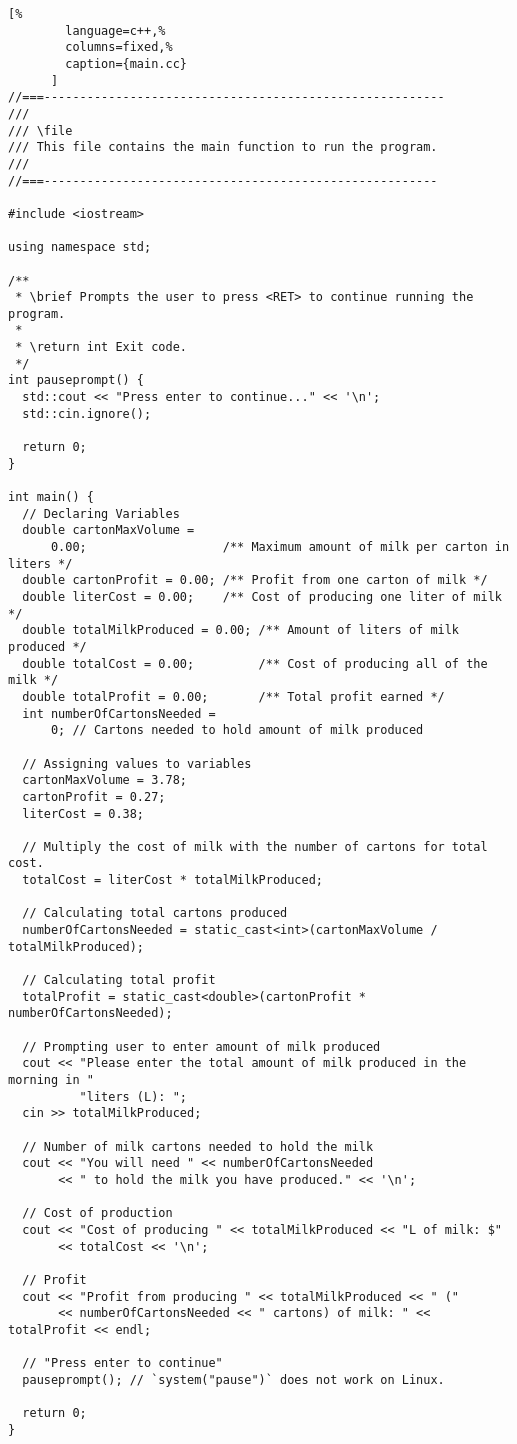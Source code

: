 \documentclass[a4paper, 11pt]{article}
\begin{document}
      \begin{lstlisting}[%
        language=c++,%
        columns=fixed,%
        caption={main.cc}
      ]
//===--------------------------------------------------------
///
/// \file
/// This file contains the main function to run the program.
///
//===-------------------------------------------------------

#include <iostream>

using namespace std;

/**
 * \brief Prompts the user to press <RET> to continue running the program.
 *
 * \return int Exit code.
 */
int pauseprompt() {
  std::cout << "Press enter to continue..." << '\n';
  std::cin.ignore();

  return 0;
}

int main() {
  // Declaring Variables
  double cartonMaxVolume =
      0.00;                   /** Maximum amount of milk per carton in liters */
  double cartonProfit = 0.00; /** Profit from one carton of milk */
  double literCost = 0.00;    /** Cost of producing one liter of milk */
  double totalMilkProduced = 0.00; /** Amount of liters of milk produced */
  double totalCost = 0.00;         /** Cost of producing all of the milk */
  double totalProfit = 0.00;       /** Total profit earned */
  int numberOfCartonsNeeded =
      0; // Cartons needed to hold amount of milk produced

  // Assigning values to variables
  cartonMaxVolume = 3.78;
  cartonProfit = 0.27;
  literCost = 0.38;

  // Multiply the cost of milk with the number of cartons for total cost.
  totalCost = literCost * totalMilkProduced;

  // Calculating total cartons produced
  numberOfCartonsNeeded = static_cast<int>(cartonMaxVolume / totalMilkProduced);

  // Calculating total profit
  totalProfit = static_cast<double>(cartonProfit * numberOfCartonsNeeded);

  // Prompting user to enter amount of milk produced
  cout << "Please enter the total amount of milk produced in the morning in "
          "liters (L): ";
  cin >> totalMilkProduced;

  // Number of milk cartons needed to hold the milk
  cout << "You will need " << numberOfCartonsNeeded
       << " to hold the milk you have produced." << '\n';

  // Cost of production
  cout << "Cost of producing " << totalMilkProduced << "L of milk: $"
       << totalCost << '\n';

  // Profit
  cout << "Profit from producing " << totalMilkProduced << " ("
       << numberOfCartonsNeeded << " cartons) of milk: " << totalProfit << endl;

  // "Press enter to continue"
  pauseprompt(); // `system("pause")` does not work on Linux.

  return 0;
}
      \end{lstlisting}
\end{document}
